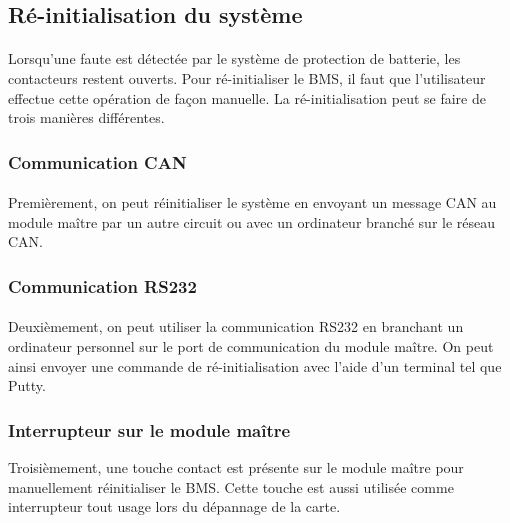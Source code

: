 \subsection{Ré-initialisation du système}

	\paragraph*{}
	Lorsqu'une faute est détectée par le système de protection de batterie, les contacteurs restent ouverts. Pour ré-initialiser le BMS, il faut que l'utilisateur effectue cette opération de façon manuelle. La ré-initialisation peut se faire de trois manières différentes.
		
	\subsubsection*{Communication CAN}
		\paragraph*{}
		Premièrement, on peut réinitialiser le système en envoyant un message CAN au module maître par un autre circuit ou avec un ordinateur branché sur le réseau CAN. 

	\subsubsection*{Communication RS232}
		\paragraph*{}	
		Deuxièmement, on peut utiliser la communication RS232 en branchant un ordinateur personnel sur le port de communication du module maître. On peut ainsi envoyer une commande de ré-initialisation avec l'aide d'un terminal tel que Putty.
				
	\subsubsection*{Interrupteur sur le module maître}
		Troisièmement, une touche contact est présente sur le module maître pour manuellement réinitialiser le BMS. Cette touche est aussi utilisée comme interrupteur tout usage lors du dépannage de la carte.
